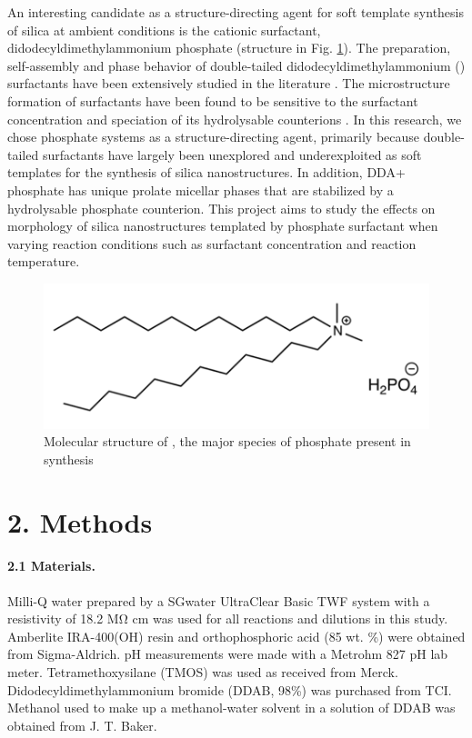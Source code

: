 \documentclass[a4paper,12pt,twocolumn]{article}
\begin{document}
An interesting candidate as a structure-directing agent for soft template synthesis of silica at ambient conditions is the cationic surfactant, didodecyldimethylammonium phosphate (structure in Fig. \ref{fig:structure}). The preparation, self-assembly and phase behavior of double-tailed didodecyldimethylammonium () surfactants have been extensively studied in the literature \cite{warr1988}. The microstructure formation of  surfactants have been found to be sensitive to the surfactant concentration and speciation of its hydrolysable counterions \cite{liu2014}. In this research, we chose  phosphate systems as a structure-directing agent, primarily because double-tailed surfactants have largely been unexplored and underexploited as soft templates for the synthesis of silica nanostructures. In addition, DDA+ phosphate has unique prolate micellar phases that are stabilized by a hydrolysable phosphate counterion. This project aims to study the effects on morphology of silica nanostructures templated by  phosphate surfactant when varying reaction conditions such as surfactant concentration and reaction temperature.

	\begin{figure}[h]
		\includegraphics[width=\linewidth]{structure.png}
  		\caption{Molecular structure of , the major species of  phosphate present in synthesis}
  		\label{fig:structure}
  	\end{figure}
	 
	 \section{2. Methods}
	 
	 \paragraph{2.1 Materials.} Milli-Q water prepared by a SGwater UltraClear Basic TWF system with a resistivity of 18.2 MΩ cm was used for all reactions and dilutions in this study. Amberlite IRA-400(OH) resin and orthophosphoric acid (85 wt. \%) were obtained from Sigma-Aldrich. pH measurements were made with a Metrohm 827 pH lab meter. Tetramethoxysilane (TMOS) was used as received from Merck. Didodecyldimethylammonium bromide (DDAB, 98\%) was purchased from TCI. Methanol used to make up a methanol-water solvent in a solution of DDAB was obtained from J. T. Baker.
	 
\end{document}
